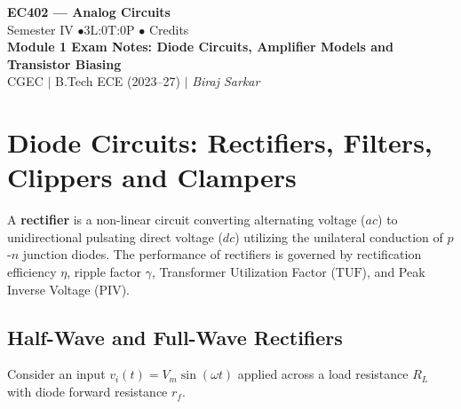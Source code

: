 \documentclass[12pt,a4paper]{article}
\begin{document}
\begin{center}
  {\LARGE\bfseries\color{myred} EC402 --- Analog Circuits}\\[5pt]
  {\normalsize\color{mydark} Semester IV \quad$\bullet$\quad 3L:0T:0P \quad$\bullet$ Credits}\\[3pt]
  {\normalsize\color{myteal}\textbf{Module 1 Exam Notes: Diode Circuits, Amplifier Models and Transistor Biasing}}\\[3pt]
  {\small\color{mydark} CGEC \;$|$\; B.Tech ECE (2023--27) \;$|$\; \textit{Biraj Sarkar}}
\end{center}
\vspace{2pt}
\noindent{\color{myred}\rule{\linewidth}{1.5pt}}
\vspace{2pt}

\hypersetup{linkcolor=mydark}
\tableofcontents
\hypersetup{linkcolor=myteal}
\newpage

\section{Diode Circuits: Rectifiers, Filters, Clippers and Clampers}

\begin{tcolorbox}[defbox, title={Rectifier Fundamentals}]
A \textbf{rectifier} is a non-linear circuit converting alternating voltage ($ac$) to unidirectional pulsating direct voltage ($dc$) utilizing the unilateral conduction of $p$-$n$ junction diodes. The performance of rectifiers is governed by rectification efficiency $\eta$, ripple factor $\gamma$, Transformer Utilization Factor ($\mathrm{TUF}$), and Peak Inverse Voltage ($\mathrm{PIV}$).
\end{tcolorbox}

\subsection{Half-Wave and Full-Wave Rectifiers}
Consider an input $v_i(t) = V_m\sin(\omega t)$ applied across a load resistance $R_L$ with diode forward resistance $r_f$.
\end{document}
